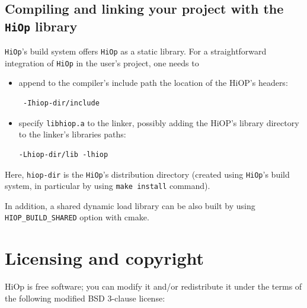 \documentclass[11pt]{article}
\newcommand{\Hi}{\texttt{HiOp}\xspace}
\begin{document}
\subsection{Compiling and linking your project with the \Hi library}
\Hi's build system offers \Hi as a static library. For a straightforward integration of \Hi in the user's project, one needs  to
\begin{itemize}
\item append to the compiler's include path the location of the HiOP's headers: \begin{verbatim} -Ihiop-dir/include \end{verbatim}
\item specify \texttt{libhiop.a} to the linker, possibly adding the HiOP's library directory to the linker's libraries paths: 
\begin{verbatim}-Lhiop-dir/lib -lhiop\end{verbatim} \end{itemize}
Here, \texttt{hiop-dir} is the \Hi's distribution directory  (created using \Hi's build system, in particular   by using \texttt{make install} command).

In addition, a shared dynamic load library can be also built by using \texttt{HIOP\_BUILD\_SHARED} option with cmake. 




 












%

\section{Licensing and copyright}
HiOp is free software; you can modify it and/or redistribute it under the terms of the following  modified BSD 3-clause license:
\end{document}
